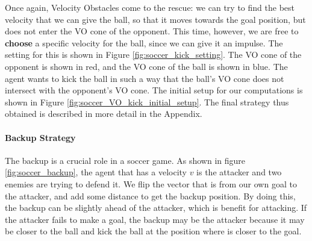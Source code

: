 \documentclass[a4paper,12pt]{article}
\begin{document}
Once again, Velocity Obstacles come to the rescue: we can try to find the best velocity that we can give the ball, so that it moves towards the goal position, but does not enter the VO cone of the opponent. This time, however, we are free to \textbf{choose} a specific velocity for the ball, since we can give it an impulse. The setting for this is shown in Figure \ref{fig:soccer_kick_setting}. The VO cone of the opponent is shown in red, and the VO cone of the ball is shown in blue. The agent wants to kick the ball in such a way that the ball's VO cone does not intersect with the opponent's VO cone. The initial setup for our computations is shown in Figure \ref{fig:soccer_VO_kick_initial_setup}. The final strategy thus obtained is described in more detail in the Appendix.







\paragraph{Backup Strategy}
The backup is a crucial role in a soccer game.
As shown in figure \ref{fig:soccer_backup}, the agent that has a velocity $v$ is the attacker and two enemies are trying to defend it.
We flip the vector that is from our own goal to the attacker, and add some distance to get the backup position.
By doing this, the backup can be slightly ahead of the attacker, which is benefit for attacking. 
If the attacker fails to make a goal, the backup may be the attacker because it may be closer to the ball and kick the ball at the position where is closer to the goal.


\end{document}
